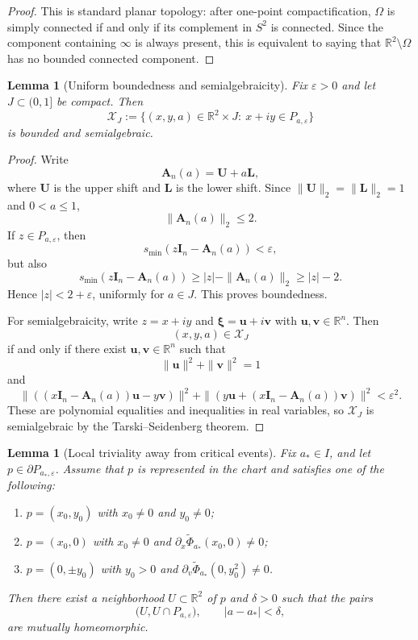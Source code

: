 \documentclass[11pt]{article}
\newtheorem{lemma}[theorem]{Lemma}
\newcommand{\R}{\mathbb{R}}
\begin{document}
\begin{proof}
This is standard planar topology: after one-point compactification, \(\Omega\) is simply connected if and only if its complement in \(S^2\) is connected. Since the component containing \(\infty\) is always present, this is equivalent to saying that \(\R^2\setminus\Omega\) has no bounded connected component.
\end{proof}

\begin{lemma}[Uniform boundedness and semialgebraicity]\label{lem:semialg}
Fix \(\varepsilon>0\) and let \(J\subset (0,1]\) be compact. Then
\[
\mathcal X_J
:=
\{(x,y,a)\in \R^2\times J:\ x+iy\in P_{a,\varepsilon}\}
\]
is bounded and semialgebraic.
\end{lemma}

\begin{proof}
Write
\[
\mathbf A_n(a)=\mathbf U+a\mathbf L,
\]
where \(\mathbf U\) is the upper shift and \(\mathbf L\) is the lower shift. Since \(\|\mathbf U\|_2=\|\mathbf L\|_2=1\) and \(0<a\le 1\),
\[
\|\mathbf A_n(a)\|_2\le 2.
\]
If \(z\in P_{a,\varepsilon}\), then
\[
s_{\min}(z\mathbf I_n-\mathbf A_n(a))<\varepsilon,
\]
but also
\[
s_{\min}(z\mathbf I_n-\mathbf A_n(a))
\ge |z|-\|\mathbf A_n(a)\|_2
\ge |z|-2.
\]
Hence \(|z|<2+\varepsilon\), uniformly for \(a\in J\). This proves boundedness.

For semialgebraicity, write \(z=x+iy\) and \(\boldsymbol\xi=\mathbf u+i\mathbf v\) with \(\mathbf u,\mathbf v\in\R^n\). Then
\[
(x,y,a)\in \mathcal X_J
\]
if and only if there exist \(\mathbf u,\mathbf v\in\R^n\) such that
\[
\|\mathbf u\|^2+\|\mathbf v\|^2=1
\]
and
\[
\|((x\mathbf I_n-\mathbf A_n(a))\mathbf u-y\mathbf v)\|^2
+
\|(y\mathbf u+(x\mathbf I_n-\mathbf A_n(a))\mathbf v)\|^2
<\varepsilon^2.
\]
These are polynomial equalities and inequalities in real variables, so \(\mathcal X_J\) is semialgebraic by the Tarski--Seidenberg theorem.
\end{proof}

\begin{lemma}[Local triviality away from critical events]\label{lem:local-trivial}
Fix \(a_*\in I\), and let \(p\in \partial P_{a_*,\varepsilon}\). Assume that \(p\) is represented in the chart and satisfies one of the following:
\begin{enumerate}
\item \(p=(x_0,y_0)\) with \(x_0\neq 0\) and \(y_0\neq 0\);
\item \(p=(x_0,0)\) with \(x_0\neq 0\) and \(\partial_x\widetilde\Phi_{a_*}(x_0,0)\neq 0\);
\item \(p=(0,\pm y_0)\) with \(y_0>0\) and \(\partial_v\widetilde\Phi_{a_*}(0,y_0^2)\neq 0\).
\end{enumerate}
Then there exist a neighborhood \(U\subset\R^2\) of \(p\) and \(\delta>0\) such that the pairs
\[
\bigl(U,U\cap P_{a,\varepsilon}\bigr),
\qquad
|a-a_*|<\delta,
\]
are mutually homeomorphic.
\end{lemma}
\end{document}
